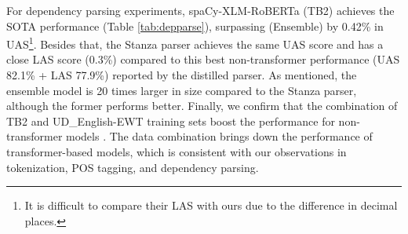 \documentclass[10pt, a4paper]{article}
\begin{document}
For dependency parsing experiments, spaCy-XLM-RoBERTa (TB2) achieves the SOTA performance (Table \ref{tab:depparse}), surpassing  (Ensemble) by 0.42\% in UAS\footnote{It is difficult to compare their LAS with ours due to the difference in decimal places.}. Besides that, the Stanza parser achieves the same UAS score and has a close LAS score (0.3\%) compared to this best non-transformer performance (UAS 82.1\% + LAS 77.9\%) reported by the distilled parser. As  mentioned, the ensemble model is 20 times larger in size compared to the Stanza parser, although the former performs better. Finally, we confirm that the combination of TB2 and UD\_English-EWT training sets boost the performance for non-transformer models \cite{liu2018parsing}. The data combination brings down the performance of transformer-based models, which is consistent with our observations in tokenization, POS tagging, and dependency parsing. 
\end{document}
